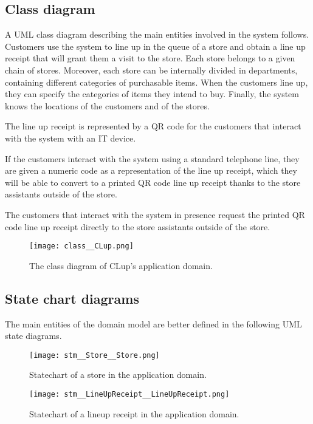 \documentclass[../../main.tex]{subfiles}
\begin{document}
\subsection{Class diagram}

A UML class diagram describing the main entities involved in the system follows.
Customers use the system to line up in the queue of a store and obtain a line up
receipt that will grant them a visit to the store. Each store belongs to a given
chain of stores. Moreover, each store can be internally divided in departments,
containing different categories of purchasable items. When the customers line
up, they can specify the categories of items they intend to buy. Finally, the
system knows the locations of the customers and of the stores.

The line up receipt is represented by a QR code for the customers that interact with the system with an IT device.

If the customers interact with the system using a standard telephone line, they are given a numeric code as a representation of the line up receipt, which they will be able to convert to a printed QR code line up receipt thanks to the store assistants outside of the store.

The customers that interact with the system in presence request the printed QR code line up receipt directly to the store assistants outside of the store.

\begin{figure}[h!]
    \centering
    \texttt{[image: class\_\_CLup.png]}
    \caption{The class diagram of CLup's application domain.}
\end{figure}

\subsection{State chart diagrams}

The main entities of the domain model are better defined in the following UML
state diagrams.

\begin{figure}[h!]
    \centering
    \texttt{[image: stm\_\_Store\_\_Store.png]}
    \caption{Statechart of a store in the application domain.}
\end{figure}

\begin{figure}[h!]
    \centering
    \texttt{[image: stm\_\_LineUpReceipt\_\_LineUpReceipt.png]}
    \caption{Statechart of a lineup receipt in the application domain.}
\end{figure}
\end{document}

